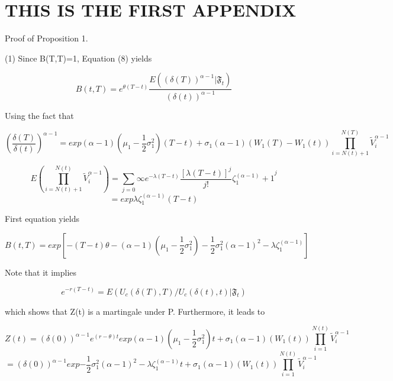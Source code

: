 {\chapter{THIS IS THE FIRST APPENDIX}}




Proof of Proposition 1.

(1) Since B(T,T)=1, Equation (8) yields

$$B(t,T)=e^{\theta (T-t)}\frac{E((\delta(T))^{\alpha-1}|\mathfrak{F}_{t})}{(\delta(t))^{\alpha-1}}$$

Using the fact that

$$(\frac{\delta(T)}{\delta(t)})^{\alpha-1}=exp{(\alpha-1)(\mu_{1}-\frac{1}{2}\sigma_{1}^{2})(T-t)
+\sigma_{1}(\alpha-1)(W_{1}(T)-W_{1}(t))}\prod_{i=N(t)+1}^{N(T)}\widetilde{V}_{i}^{\alpha-1}$$

$$E(\prod_{i=N(t)+1}^{N(t)}\widetilde{V}_{i}^{\alpha-1})=\sum_{j=0}{\infty}e^{-\lambda(T-t)}\frac{[\lambda(T-t)]^{j}}{j!}{\zeta_{1}^{(\alpha-1)}+1}^{j}$$
$$=exp{\lambda\zeta_{1}^{(\alpha-1)}(T-t)}$$

First equation yields

$$B(t,T)=exp[-(T-t){\theta -(\alpha-1)(\mu_{1}-\frac{1}{2}\sigma_{1}^{2})-\frac{1}{2}\sigma_{1}^{2}(\alpha-1)^{2}-\lambda\zeta_{1}^{(\alpha-1)}}]$$

Note that it implies

$$e^{-r(T-t)}=E(U_{c}(\delta(T),T)/U_{c}(\delta(t),t)|\mathfrak{F}_{t})$$

which shows that Z(t) is a martingale under P. Furthermore, it leads to

$$Z(t)=(\delta(0))^{\alpha-1}e^{(r-\theta)t}exp{(\alpha-1)(\mu_{1}-\frac{1}{2}\sigma_{1}^{2})t +\sigma_{1}(\alpha-1)(W_{1}(t))}\prod_{i=1}^{N(t)}\widetilde{V}_{i}^{\alpha-1}$$
$$=(\delta(0))^{\alpha-1}exp{-\frac{1}{2}\sigma_{1}^{2}(\alpha-1)^{2}-\lambda\zeta_{1}^{(\alpha-1)}}t
+\sigma_{1}(\alpha-1)(W_{1}(t))\prod_{i=1}^{N(t)}\widetilde{V}_{i}^{\alpha-1}$$

